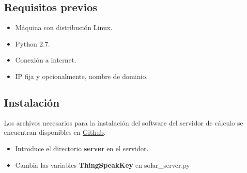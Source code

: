 \subsection{Requisitos previos}
\label{makereference7.3.1}

\begin{itemize}
\item Máquina con distribución Linux.
\item Python 2.7.
\item Conexión a internet.
\item IP fija y opcionalmente, nombre de dominio.
\end{itemize}

\subsection{Instalación}
\label{makereference7.3.2}
Los archivos necesarios para la instalación del software del servidor de cálculo se encuentran disponibles en \href{https://github.com/MrSlide22/TFG/server}{Github}.

\begin{itemize}
	\item Introduce el directorio \textbf{server} en el servidor.
	\item Cambia las variables \textbf{ThingSpeakKey} en solar\_server.py
\end{itemize}
